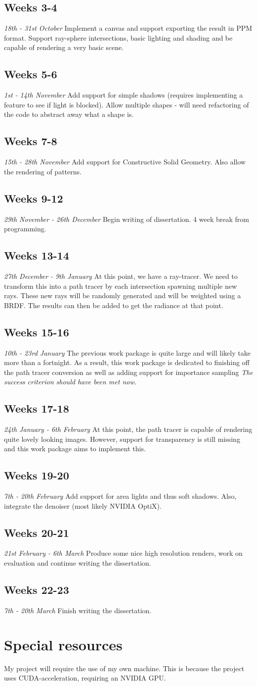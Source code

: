 \documentclass[12pt, a4paper]{article}
\newcommand{\newtime}[3]{
    \subsection*{#1}
    \vspace{-\baselineskip}
    \emph{#2}
    \vspace{\baselineskip}
    \newline
    #3
}
\begin{document}
    \newtime{Weeks 3-4}{18th - 31st October}{Implement a canvas and support exporting the result in PPM format. Support ray-sphere intersections, basic lighting and shading and be capable of rendering a very basic scene.}

    \newtime{Weeks 5-6}{1st - 14th November}{Add support for simple shadows (requires implementing a feature to see if light is blocked). Allow multiple shapes - will need refactoring of the code to abstract away what a shape is.}

    \newtime{Weeks 7-8}{15th - 28th November}{Add support for Constructive Solid Geometry. Also allow the rendering of patterns.}

    \newtime{Weeks 9-12}{29th November - 26th December}{Begin writing of dissertation. 4 week break from programming.}

    \newtime{Weeks 13-14}{27th December - 9th January}{At this point, we have a ray-tracer. We need to transform this into a path tracer by each intersection spawning multiple new rays. These new rays will be randomly generated and will be weighted using a BRDF. The results can then be added to get the radiance at that point.}

    \newtime{Weeks 15-16}{10th - 23rd January}{The previous work package is quite large and will likely take more than a fortnight. As a result, this work package is dedicated to finishing off the path tracer conversion as well as adding support for importance sampling \emph{The success criterion should have been met now.}}

    \newtime{Weeks 17-18}{24th January - 6th February}{At this point, the path tracer is capable of rendering quite lovely looking images. However, support for transparency is still missing and this work package aims to implement this.}

    \newtime{Weeks 19-20}{7th - 20th February}{Add support for area lights and thus soft shadows. Also, integrate the denoiser (most likely NVIDIA OptiX).}

    \newtime{Weeks 20-21}{21st February - 6th March}{Produce some nice high resolution renders, work on evaluation and continue writing the dissertation.}

    \newtime{Weeks 22-23}{7th - 20th March}{Finish writing the dissertation.}

    \section*{Special resources}
    My project will require the use of my own machine. This is because the project uses CUDA-acceleration, requiring an NVIDIA GPU.
\end{document}
